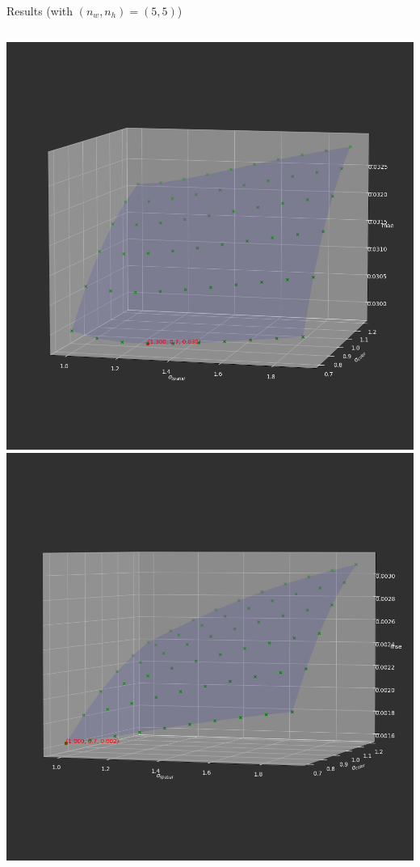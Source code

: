 \begin{frame}{Results (with $(n_w, n_h) = (5, 5)$)}
\centering
\begin{columns}
\centering
\includegraphics[scale=0.15]{images/results/bilateral/plot_mae.png}
\centering
\includegraphics[scale=0.15]{images/results/bilateral/plot_mse.png}
\end{columns}
\end{frame}

